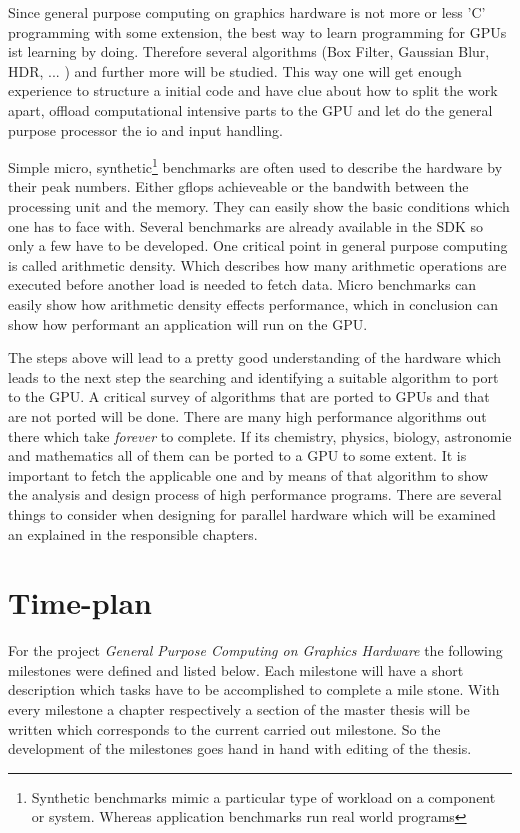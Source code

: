 Since general purpose computing on graphics hardware is not more or less 'C'
programming with some extension, the best way to learn programming for GPUs ist
learning by doing. Therefore several algorithms (Box Filter, Gaussian Blur, HDR,
... ) and further more will be studied.
This way one will get enough experience to structure a initial code and have
clue about how to split the work apart, offload computational intensive parts to
the \gls{GPU} and let do the general purpose processor the io and input handling.

Simple micro, synthetic\footnote{Synthetic benchmarks mimic a particular type of
workload on a component or system. Whereas application benchmarks run real world
programs} benchmarks are often used to describe the hardware by their peak
numbers. Either gflops achieveable or the bandwith between the processing unit
and the memory. They can easily show the basic conditions which one has to face 
with. Several benchmarks are already available in the SDK so only a few have to 
be developed. One critical point in general purpose computing is called
arithmetic density. Which describes how many arithmetic operations are executed
before another load is needed to fetch data. Micro benchmarks can easily show 
how arithmetic density effects performance, which in conclusion can show how 
performant an application will run on the GPU. 

The steps above will lead to a pretty good understanding of the hardware which
leads to the next step the searching and identifying a suitable algorithm to
port to the GPU. A critical survey of algorithms that are ported to GPUs and
that are not ported will be done. There are many high performance algorithms out
there which take \emph{forever} to complete. If its chemistry, physics, biology,
astronomie and mathematics all of them can be ported to a \gls{GPU} to some extent. It
is important to fetch the applicable one and by means of that algorithm to show
the analysis and design process of high performance programs. There are
several things to consider when designing for parallel hardware which will be
examined an explained in the responsible chapters.

\section*{Time-plan} 
\label{sub:time_plan} 
For the project \emph{General Purpose Computing on Graphics Hardware} the
following milestones were defined and listed below. Each milestone will have a
short description which tasks have to be accomplished to complete a mile stone.
With every milestone a chapter respectively a section of the master thesis will
be written which corresponds to the current carried out milestone. So the 
development of the milestones goes hand in hand with editing of the thesis.

